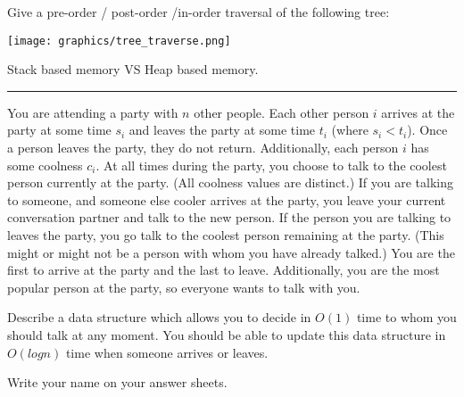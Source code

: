 \documentclass[12pt]{exam}
\newcommand{\seperate}{\begin{center}\noindent\rule{18cm}{0.75pt}\end{center}}
\begin{document}
\begin{questions}
    \question[5] Give a pre-order / post-order /in-order traversal of the following tree:

    \texttt{[image: graphics/tree\_traverse.png]}

    \question[20]  Stack based memory VS Heap based memory.

    \question[20]

    \seperate

    \question[20] You are attending a party with $n$ other people. Each other person $i$ arrives at the party at some time
    $s_i$ and leaves the party at some time $t_i$ (where $s_i < t_i$). Once a person leaves the party, they do not return.
    Additionally, each person $i$ has some coolness $c_i$. At all times during the party, you choose to talk to the coolest person currently at the party. (All coolness values are distinct.) If you are talking to someone, and someone else cooler arrives at the party, you leave your current conversation partner and talk to the new person. If the person you are talking to leaves the party, you go talk to the coolest person remaining at the party. (This might or might not be a person with whom you have already talked.) You are the first to arrive at the party and the last to leave. Additionally, you are the most popular
    person at the party, so everyone wants to talk with you.

    Describe a data structure which allows you to decide in $O(1)$ time to whom you should talk at any moment. You should be able to update this data structure in $O(log n)$ time when someone arrives or leaves.

    \question[5]Write your name on your answer sheets.

\end{questions}
\end{document}
